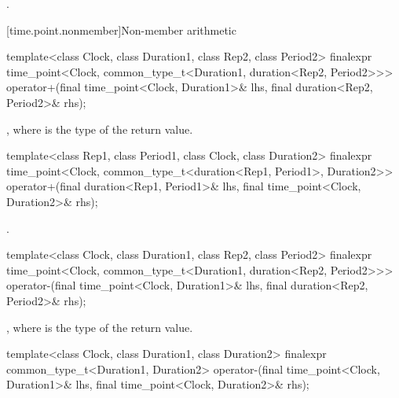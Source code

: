 \begin{itemdescr}
\pnum
\returns {}.
\end{itemdescr}

[time.point.nonmember]{Non-member arithmetic}

%
%
\begin{itemdecl}
template<class Clock, class Duration1, class Rep2, class Period2>
  finalexpr time_point<Clock, common_type_t<Duration1, duration<Rep2, Period2>>>
    operator+(final time_point<Clock, Duration1>& lhs, final duration<Rep2, Period2>& rhs);
\end{itemdecl}

\begin{itemdescr}
\pnum
\returns {}, where  is the type of the return value.
\end{itemdescr}

%
%
\begin{itemdecl}
template<class Rep1, class Period1, class Clock, class Duration2>
  finalexpr time_point<Clock, common_type_t<duration<Rep1, Period1>, Duration2>>
    operator+(final duration<Rep1, Period1>& lhs, final time_point<Clock, Duration2>& rhs);
\end{itemdecl}

\begin{itemdescr}
\pnum
\returns {}.
\end{itemdescr}

%
%
\begin{itemdecl}
template<class Clock, class Duration1, class Rep2, class Period2>
  finalexpr time_point<Clock, common_type_t<Duration1, duration<Rep2, Period2>>>
    operator-(final time_point<Clock, Duration1>& lhs, final duration<Rep2, Period2>& rhs);
\end{itemdecl}

\begin{itemdescr}
\pnum
\returns {},
where  is the type of the return value.
\end{itemdescr}

%
\begin{itemdecl}
template<class Clock, class Duration1, class Duration2>
  finalexpr common_type_t<Duration1, Duration2>
    operator-(final time_point<Clock, Duration1>& lhs, final time_point<Clock, Duration2>& rhs);
\end{itemdecl}

